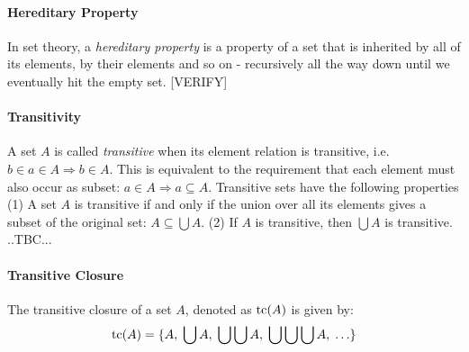 \paragraph{Hereditary Property}
In set theory, a \emph{hereditary property} is a property of a set that is inherited by all of its elements, by their elements and so on - recursively all the way down until we eventually hit the empty set. [VERIFY]







\paragraph{Transitivity}
A set $A$ is called \emph{transitive} when its element relation is transitive, i.e. $b \in a \in A \Rightarrow b \in A$. This is equivalent to the requirement that each element must also occur as subset: $a \in A \Rightarrow a \subseteq A$. Transitive sets have the following properties (1) A set $A$ is transitive if and only if the union over all its elements gives a subset of the original set: $A \subseteq \bigcup A$. (2) If $A$ is transitive, then $\bigcup A$ is transitive. ..TBC...

\paragraph{Transitive Closure}
The transitive closure of a set $A$, denoted as $\operatorname{tc}(A)$ is given by:
\begin{equation}
\label{Eq:TransitiveClosure}
\operatorname{tc}(A) = \{A, \; 
           \bigcup A, \; 
           \bigcup \bigcup A, \;
           \bigcup \bigcup \bigcup A, \;
           \ldots  \}
\end{equation}




